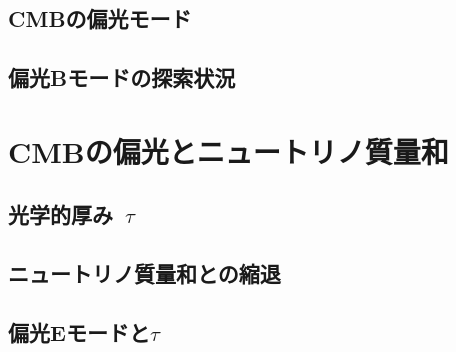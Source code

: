 \subsection{CMBの偏光モード}

\subsection{偏光Bモードの探索状況}

\section{CMBの偏光とニュートリノ質量和}

\subsection{光学的厚み~$\tau$}

\subsection{ニュートリノ質量和との縮退}

\subsection{偏光Eモードと$\tau$}
\label{E_and_tau}
